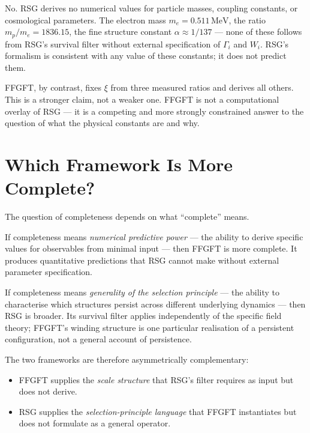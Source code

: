 No. RSG derives no numerical values for particle masses, coupling constants,
or cosmological parameters. The electron mass $m_e = 0.511\,\text{MeV}$,
the ratio $m_p/m_e = 1836.15$, the fine structure constant
$\alpha \approx 1/137$ — none of these follows from RSG's survival filter
without external specification of $\Gamma_i$ and $W_i$. RSG's formalism is
consistent with any value of these constants; it does not predict them.

FFGFT, by contrast, fixes $\xi$ from three measured ratios and derives
all others. This is a stronger claim, not a weaker one. FFGFT
is not a computational overlay of RSG — it is a competing and more
strongly constrained answer to the question of what the physical
constants are and why.

\section{Which Framework Is More Complete?}

The question of completeness depends on what ``complete'' means.

If completeness means \emph{numerical predictive power} — the ability to
derive specific values for observables from minimal input — then FFGFT is
more complete. It produces quantitative predictions that RSG cannot make
without external parameter specification.

If completeness means \emph{generality of the selection principle}
— the ability to characterise which structures persist across different
underlying dynamics — then RSG is broader. Its survival filter applies
independently of the specific field theory; FFGFT's winding structure is
one particular realisation of a persistent configuration, not a general
account of persistence.

The two frameworks are therefore asymmetrically complementary:

\begin{itemize}
  \item FFGFT supplies the \emph{scale structure} that RSG's filter requires
        as input but does not derive.
  \item RSG supplies the \emph{selection-principle language} that FFGFT
        instantiates but does not formulate as a general operator.
\end{itemize}

